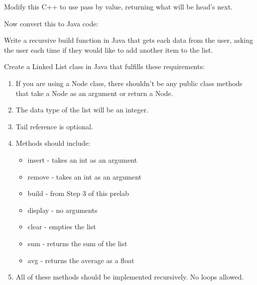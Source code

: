\documentclass[../../main.tex]{subfiles}
\begin{document}
\begin{steps}
      Modify this C++ to use pass by value, returning what will be head's next.\\
      \vspace{10cm}
   \item Now convert this to Java code:\\
      \vspace{10cm}
   \item Write a recursive build function in Java that gets each data from the user, asking the user
      each time if they would like to add another item to the list.\\
      \vspace{10cm}
   \item Create a Linked List class in Java that fulfills these requirements:
   \begin{enumerate}[label=\Alph*.]
      \item If you are using a Node class, there shouldn't be any public
         class methods that take a Node as an argument or return a Node.
      \item The data type of the list will be an integer.
      \item Tail reference is optional.
      \item Methods should include:
         \begin{itemize}
            \item insert - takes an int as an argument
            \item remove - takes an int as an argument
            \item build - from Step 3 of this prelab
            \item display - no arguments
            \item clear - empties the list
            \item sum - returns the sum of the list
            \item avg - returns the average as a float
         \end{itemize}
      \item All of these methods should be implemented recursively. No loops allowed.
   \end{enumerate}
\end{steps}
\end{document}
